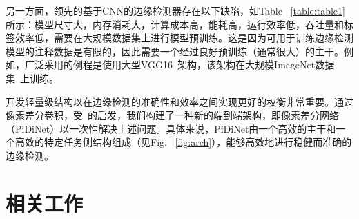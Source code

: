 \documentclass[10pt,twocolumn,letterpaper]{article}
\begin{document}
另一方面，领先的基于CNN的边缘检测器存在以下缺陷，如Table ~\ref{table:table1}所示：模型尺寸大，内存消耗大，计算成本高，能耗高，运行效率低，吞吐量和标签效率低，需要在大规模数据集上进行模型预训练。这是因为可用于训练边缘检测模型的注释数据是有限的，因此需要一个经过良好预训练（通常很大）的主干。例如，广泛采用的例程是使用大型VGG16~\cite{simonyan2014very}架构，该架构在大规模ImageNet数据集~\cite{deng2009imagenet}上训练。

开发轻量级结构以在边缘检测的准确性和效率之间实现更好的权衡非常重要。通过像素差分卷积，受~\cite{he2016residual, howard2017mobilenets}的启发，我们构建了一种新的端到端架构，即像素差分网络（PiDiNet）以一次性解决上述问题。具体来说，PiDiNet由一个高效的主干和一个高效的特定任务侧结构组成（见Fig. ~\ref{fig:arch}），能够高效地进行稳健而准确的边缘检测。


\section{相关工作}
\end{document}
